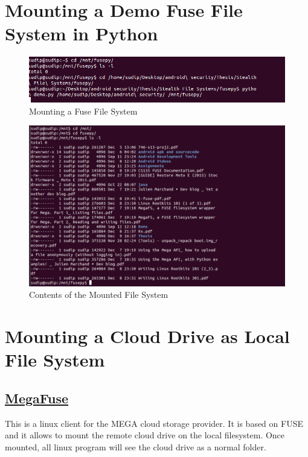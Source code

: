 \section{Mounting a Demo Fuse File System in Python}
\begin{figure}[h]
   \centering
   \includegraphics[width=15cm]{Figures/fig05/fusepy}
   \caption{Mounting a Fuse File System}
   
  \end{figure}
  \begin{figure}[h]
     \centering
     \includegraphics[width=15cm]{Figures/fig05/mnt}
     \caption{Contents of the Mounted File System}
     
    \end{figure}
    
    
\vspace{2cm}    
\section{Mounting a Cloud Drive as Local File System}



\subsection{\href{https://github.com/matteoserva/MegaFuse}{MegaFuse}}
This is a linux client for the MEGA cloud storage provider. It is based on FUSE and it allows to mount the remote cloud drive on the local filesystem. Once mounted, all linux program will see the cloud drive as a normal folder.\\

